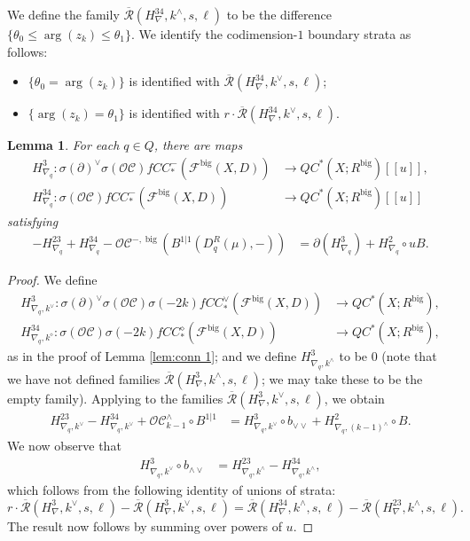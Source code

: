 \documentclass{article}
\newtheorem{lem}{Lemma}[section]
\def\fuk{\EuF}
\def\cO{\mathcal{O}}
\def\cC{\mathcal{C}}
\def\fuk{\mathcal{F}}
\def\Rbar{\overline{\mathcal{R}}}
\def\big{{\operatorname{big}}}
\begin{document}
We define the family $\Rbar(H^{34}_\nabla,k^\wedge,s,\ell)$ to be the difference $\{\theta_0 \le \arg(z_k) \le \theta_1\}$. 
We identify the codimension-$1$ boundary strata as follows:
\begin{itemize}
    \item $\{\theta_0 = \arg(z_k)\}$ is identified with $\Rbar(H^{34}_\nabla,k^\vee,s,\ell)$;
    \item $\{\arg(z_k) = \theta_1\}$ is identified with $r \cdot \Rbar(H^{34}_\nabla,k^\vee,s,\ell)$.
\end{itemize}

\begin{lem}\label{lem:conn 3}
    For each $q \in Q$, there are maps
    \begin{align*}
        H^3_{\nabla_q}:\sigma(\partial)^\vee \sigma(\cO\cC) fCC_*^-(\fuk^\big(X,D)) & \to QC^*(X;R^\big)[[u]],\\
        H^{34}_{\nabla_q}:\sigma(\cO\cC)fCC_*^-(\fuk^\big(X,D)) &\to QC^*(X;R^\big)[[u]]
    \end{align*}
    satisfying
    \begin{align}\label{eq:H3 nab}
         -H^{23}_{\nabla_q} + H^{34}_{\nabla_q} - \cO\cC^{-,\big}(B^{1|1}(D_q^R(\mu),-)) &= \partial(H^3_{\nabla_q}) + H^2_{\nabla_q} \circ uB.
    \end{align}
\end{lem}
\begin{proof}
    We define 
    \begin{align*}
        H^3_{\nabla_q,k^\vee}:\sigma(\partial)^\vee\sigma(\cO\cC)\sigma(-2k) fCC_*^\vee(\fuk^\big(X,D)) &\to QC^*(X;R^\big),\\
        H^{34}_{\nabla_q,k^\diamond}:\sigma(\cO\cC)\sigma(-2k) fCC_*^\diamond(\fuk^\big(X,D)) &\to QC^*(X;R^\big),
    \end{align*}
    as in the proof of Lemma \ref{lem:conn 1}; and we define $H^3_{\nabla_q,k^\wedge}$ to be $0$ (note that we have not defined families $\Rbar(H^3_\nabla,k^\wedge,s,\ell)$; we may take these to be the empty family). 
    Applying \cite[Lemma 4.18]{relfukii} to the families $\Rbar(H^3_\nabla,k^\vee,s,\ell)$, we obtain
    \begin{align}\label{eq:H23 H34}
        H^{23}_{\nabla_q,k^\vee} - H^{34}_{\nabla_q,k^\vee} + \cO\cC^\wedge_{k-1} \circ B^{1|1}&=  H^3_{\nabla_q,k^\vee} \circ b_{\vee\vee} + H^2_{\nabla_q,(k-1)^\wedge} \circ B.
    \end{align}
    We now observe that
    \begin{align}\label{eq:H3 wedge vee}
        H^3_{\nabla_q,k^\vee} \circ b_{\wedge\vee} &= H^{23}_{\nabla_q,k^\wedge} - H^{34}_{\nabla_q,k^\wedge},
    \end{align}
    which follows from the following identity of unions of strata:
    $$r \cdot \Rbar(H^3_\nabla,k^\vee,s,\ell) - \Rbar(H^3_\nabla,k^\vee,s,\ell) = \Rbar(H^{34}_\nabla,k^\wedge,s,\ell) - \Rbar(H^{23}_\nabla,k^\wedge,s,\ell).$$
    The result now follows by summing over powers of $u$.
\end{proof}
\end{document}
